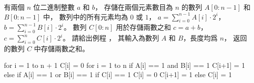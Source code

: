 \startEXERCISE
有兩個 $n$ 位二進制整數 $a$ 和 $b$，
存儲在兩個元素數目為 $n$ 的數列 $A[0:n-1]$ 和 $B[0:n-1]$ 中，
數列中的所有元素均為 $0$ 或 $1$，
$a = \sum_{i=0}^{n-1}A[i]\cdot 2^i$，
$b = \sum_{i=0}^{n-1}B[i]\cdot 2^i$。
數列 $C[0:n]$ 用於存儲兩數之和 $c=a+b$，
$c = \sum_{i=0}^{n}C[i]\cdot 2^i$。
請給出例程 ，
其輸入為數列 $A$ 和 $B$，長度均爲 $n$，
返回的數列 $C$ 中存儲兩數之和。
\stopEXERCISE
\startANSWER

\startCLRSCODE
for i = 1 to n + 1
	C[i] = 0
for i = 1 to n
	if A[i] == 1 and B[i] == 1
		C[i+1] = 1
	else if A[i] == 1 or B[i] == 1
		if C[i] == 1
			C[i] = 0
			C[i+1] = 1
		else
			C[i] = 1
\stopCLRSCODE

\stopANSWER
